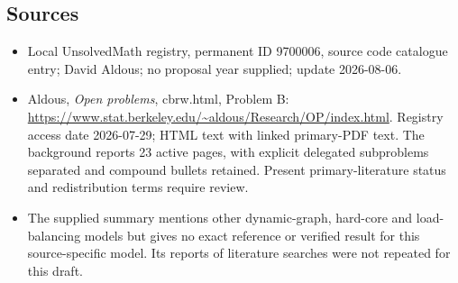 \documentclass[11pt]{article}
\begin{document}
\subsection{Sources}
\begin{itemize}
\item Local UnsolvedMath registry, permanent ID 9700006, source code catalogue entry; David Aldous; no proposal year supplied; update 2026-08-06.
\item Aldous, \emph{Open problems}, cbrw.html, Problem B: \url{https://www.stat.berkeley.edu/~aldous/Research/OP/index.html}. Registry access date 2026-07-29; HTML text with linked primary-PDF text. The background reports 23 active pages, with explicit delegated subproblems separated and compound bullets retained. Present primary-literature status and redistribution terms require review.
\item The supplied summary mentions other dynamic-graph, hard-core and load-balancing models but gives no exact reference or verified result for this source-specific model. Its reports of literature searches were not repeated for this draft.
\end{itemize}
\end{document}
